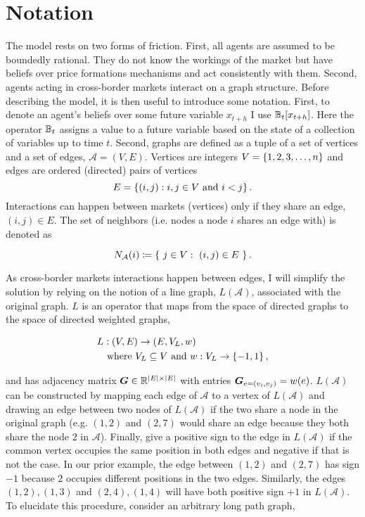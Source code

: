 \section{Notation}
The model rests on two forms of friction. First, all agents are assumed to be boundedly rational. They do not know the workings of the market but have beliefs over price formations mechanisms and act consistently with them. Second, agents acting in cross-border markets interact on a graph structure. Before describing the model, it is then useful to introduce some notation. First, to denote an agent's beliefs over some future variable $x_{t+h}$ I use $\mathbb{B}_t[x_{t+h}]$. Here the operator $\mathbb{B}_t$ assigns a value to a future variable based on the state of a collection of variables up to time $t$. Second, graphs are defined as a tuple of a set of vertices and a set of edges, $\mathcal{A} = (V, E)$. Vertices are integers $V = \left\{1, 2, 3, \ldots, n\right\}$ and edges are ordered (directed) pairs of vertices \begin{equation*}E = \left\{(i, j) : i, j \in V \text{ and } i < j\right\}.\end{equation*} Interactions can happen between markets (vertices) only if they share an edge, $(i, j) \in E$. The set of neighbors (i.e. nodes a node $i$ shares an edge with) is denoted as

\begin{equation}
  N_{\mathcal{A}}(i) \coloneqq \left\{ \ j \in V: \ (i, j) \in E \ \right\}.
\end{equation}


As cross-border markets interactions happen between edges, I will simplify the solution by relying on the notion of a line graph, $L(\mathcal{A})$, associated with the original graph. $L$ is an operator that maps from the space of directed graphs to the space of directed weighted graphs,

\begin{equation}
  \begin{split}
    L&: (V, E) \to (E, V_{L}, w)\\
    &\text{ where } V_{L}\subseteq V \text{ and } w: V_{L} \to \left\{-1, 1\right\},
  \end{split}
\end{equation}


and has adjacency matrix $\bm{G} \in \mathbb{R}^{\lvert E\rvert\times \lvert E\rvert}$ with entries $\bm{G}_{e = (v_i, v_j)} = w(e)$. $L(\mathcal{A})$ can be constructed by mapping each edge of $\mathcal{A}$ to a vertex of $L(\mathcal{A})$ and drawing an edge between two nodes of $L(\mathcal{A})$ if the two share a node in the original graph (e.g. $(1, 2)$ and $(2, 7)$ would share an edge because they both share the node $2$ in $\mathcal{A}$). Finally, give a positive sign to the edge in $L(\mathcal{A})$ if the common vertex occupies the same position in both edges and negative if that is not the case. In our prior example, the edge between $(1, 2)$ and $(2, 7)$ has sign $-1$ because $2$ occupies different positions in the two edges. Similarly, the edges $(1, 2), (1, 3)$ and $(2, 4), (1, 4)$ will have both positive sign $+1$ in $L(\mathcal{A})$. To elucidate this procedure, consider an arbitrary long path graph,

